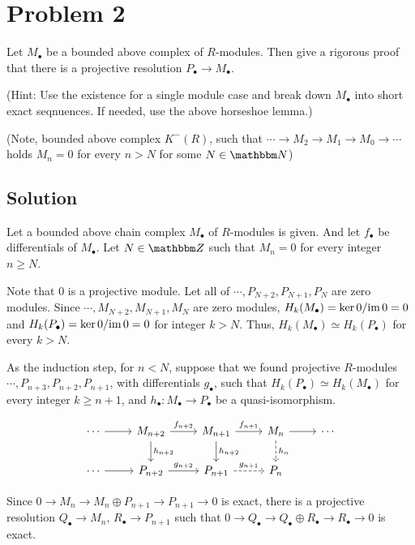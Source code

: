 \section*{Problem 2}

Let \(M_\bullet\) be a bounded above complex of \(R\)-modules.
Then give a rigorous proof that there is a projective resolution
\(P_\bullet \to M_\bullet\).

(Hint: Use the existence for a single module case
and break down \(M_\bullet\) into short exact seqnuences.
If needed, use the above horseshoe lemma.)

(Note, bounded above complex \(K^-(R)\), such that \(\cdots \to M_2 \to M_1 \to M_0 \to \cdots\) holds \(M_{n} = 0\) for every \(n > N\) for some \(N \in \bbN\))

\subsection*{Solution}

Let a bounded above chain complex \(M_\bullet\) of \(R\)-modules is given.
And let \(f_\bullet\) be differentials of \(M_\bullet\).
Let \(N \in \bbZ\) such that \(M_n = 0\) for every integer \(n \ge N\).

Note that \(0\) is a projective module.
Let all of \(\cdots, P_{N + 2}, P_{N + 1}, P_N\) are zero modules.
Since \(\cdots, M_{N + 2}, M_{N + 1}, M_N\) are zero modules,
\(H_k(M_\bullet) = \ker 0 / \textnormal{im}\, 0 = 0\)
and \(H_k(P_\bullet) = \ker 0 / \textnormal{im}\, 0 = 0\) for integer \(k > N\).
Thus, \(H_k(M_\bullet) \simeq H_k(P_\bullet)\) for every \(k > N\).

As the induction step,
for \(n < N\),
suppose that we found projective \(R\)-modules \(\cdots, P_{n + 3}, P_{n + 2}, P_{n + 1}\),
with differentials \(g_\bullet\),
such that \(H_k(P_\bullet) \simeq H_k(M_\bullet)\) for every integer \(k \ge n + 1\),
and \(h_\bullet: M_\bullet \to P_\bullet\) be a quasi-isomorphism.

\[\begin{tikzcd}
  \cdots \ar{r} & M_{n + 2} \ar["h_{n + 2}"]{d} \ar["f_{n + 2}"]{r} & M_{n + 1} \ar["h_{n + 2}"]{d} \ar["f_{n + 1}"]{r} & M_n \ar[dashed, "h_n"]{d} \ar{r} & \cdots \\
  \cdots \ar{r} & P_{n + 2} \ar["g_{n + 2}"]{r} & P_{n + 1} \ar[dashed, "g_{n + 1}"]{r} & P_n
\end{tikzcd}\]

Since \(0 \to M_n \to M_n \oplus P_{n + 1} \to P_{n+1} \to 0\) is exact,
there is a projective resolution \(Q_\bullet \to M_n\), \(R_\bullet \to P_{n + 1}\) such that \(0 \to Q_\bullet \to Q_\bullet \oplus R_\bullet \to R_\bullet \to 0\) is exact.

